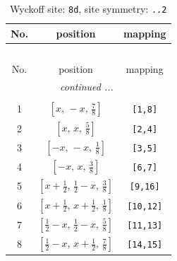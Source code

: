 \documentclass[fleqn,8pt]{jsarticle}
\begin{document}
\begin{longtable}{ccc}
\caption{Wyckoff site: {\tt 8d}, site symmetry: {\tt ..2}}
 \\
 \hline \hline
No. & position & mapping \\ \hline \endfirsthead

\multicolumn{2}{l}{\tablename\ \thetable{}} \\
 \hline \hline
No. & position & mapping \\ \hline \endhead

 \hline \hline
\multicolumn{2}{r}{\footnotesize\it continued ...} \\ \endfoot

 \hline \hline
\multicolumn{2}{r}{} \\ \endlastfoot

1 & $\left[ x,\, - x,\, \frac{7}{8} \right]$ & {\tt [1,8]} \\ \hline
2 & $\left[ x,\, x,\, \frac{5}{8} \right]$ & {\tt [2,4]} \\ \hline
3 & $\left[ - x,\, - x,\, \frac{1}{8} \right]$ & {\tt [3,5]} \\ \hline
4 & $\left[ - x,\, x,\, \frac{3}{8} \right]$ & {\tt [6,7]} \\ \hline
5 & $\left[ x + \frac{1}{2},\, \frac{1}{2} - x,\, \frac{3}{8} \right]$ & {\tt [9,16]} \\ \hline
6 & $\left[ x + \frac{1}{2},\, x + \frac{1}{2},\, \frac{1}{8} \right]$ & {\tt [10,12]} \\ \hline
7 & $\left[ \frac{1}{2} - x,\, \frac{1}{2} - x,\, \frac{5}{8} \right]$ & {\tt [11,13]} \\ \hline
8 & $\left[ \frac{1}{2} - x,\, x + \frac{1}{2},\, \frac{7}{8} \right]$ & {\tt [14,15]} \\
\end{longtable}
\renewcommand{\arraystretch}{1.2}
\end{document}
